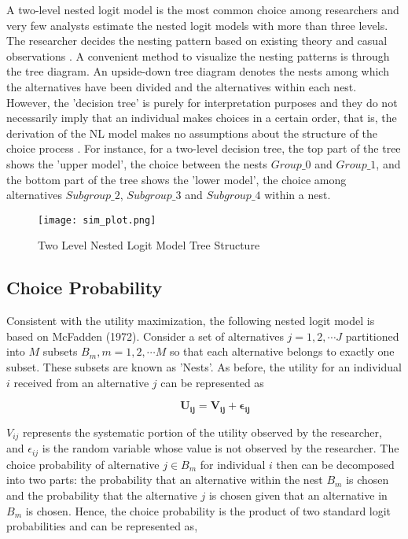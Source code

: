 \documentclass[a4paper,11pt]{article}
\begin{document}
    A two-level nested logit model is the most common choice among researchers and very few analysts estimate the nested logit models with more than three levels. The researcher decides the nesting pattern based on existing theory and casual observations \cite{Ramaul&Ramaul}. A convenient method to visualize the nesting patterns is through the tree diagram. An upside-down tree diagram denotes the nests among which the alternatives have been divided and the alternatives within each nest. However, the 'decision tree' is purely for interpretation purposes and they do not necessarily imply that an individual makes choices in a certain order, that is, the derivation of the NL model makes no assumptions about the structure of the choice process \cite{borsch2012econometric}. For instance, for a two-level decision tree, the top part of the tree shows the 'upper model', the choice between the nests $Group\_0$ and $Group\_1$, and the bottom part of the tree shows the 'lower model', the choice among alternatives $Subgroup\_2$, $Subgroup\_3$ and $Subgroup\_4$ within a nest.\\

    \begin{figure}[htb]
        \centering
        \texttt{[image: sim\_plot.png]}
        \caption{Two Level Nested Logit Model Tree Structure}
        \label{fig: Sim_Decision Tree}
    \end{figure}


\subsection{Choice Probability}
\label{subsec: Choice Probability}

    Consistent with the utility maximization, the following nested logit model is based on McFadden (1972). Consider a set of alternatives $j = 1, 2, \cdots J$ partitioned into $M$ subsets $B_{m}, m = 1, 2, \cdots M$ so that each alternative belongs to exactly one subset. These subsets are known as 'Nests'. As before, the utility for an individual $i$ received from an alternative $j$ can be represented as

    \begin{equation*}
        \qquad \mathbf{U_{ij} = V_{ij} + \epsilon_{ij}}
    \end{equation*}

    $V_{ij}$ represents the systematic portion of the utility observed by the researcher, and $\epsilon_{ij}$ is the random variable whose value is not observed by the researcher. The choice probability of alternative $j \in B_{m}$ for individual $i$ then can be decomposed into two parts: the probability that an alternative within the nest $B_{m}$ is chosen and the probability that the alternative $j$ is chosen given that an alternative in $B_{m}$ is chosen. Hence, the choice probability is the product of two standard logit probabilities and can be represented as,
\end{document}
